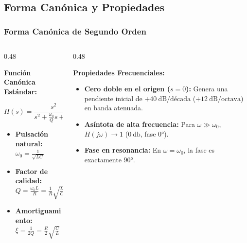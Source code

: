 \subsection{Forma Canónica y Propiedades}
\begin{frame}
  \frametitle{Forma Canónica de Segundo Orden}

  \begin{columns}[t, onlytextwidth]
    \begin{column}{0.48\textwidth}
      \begin{tarjeta}
        {\fontsize{9pt}{11pt}\selectfont \textbf{\color{NavyDark} Función Canónica Estándar:}}\\[2pt]
        {\fontsize{8pt}{10pt}\selectfont
        \[ H(s) = \frac{s^2}{s^2 + \frac{\omega_0}{Q} s + \omega_0^2} = \frac{s^2}{s^2 + 2\xi\omega_0 s + \omega_0^2} \]
        \begin{itemize}\setlength{\itemsep}{2pt}
          \item \textbf{Pulsación natural:} $\omega_0 = \frac{1}{\sqrt{LC}}$
          \item \textbf{Factor de calidad:} $Q = \frac{\omega_0 L}{R} = \frac{1}{R} \sqrt{\frac{L}{C}}$
          \item \textbf{Amortiguamiento:} $\xi = \frac{1}{2Q} = \frac{R}{2} \sqrt{\frac{C}{L}}$
        \end{itemize}
        }
      \end{tarjeta}
    \end{column}

    \begin{column}{0.48\textwidth}
      \begin{tarjeta}
        {\fontsize{9pt}{11pt}\selectfont \textbf{\color{NavyDark} Propiedades Frecuenciales:}}\\[2pt]
        {\fontsize{8pt}{10pt}\selectfont
        \begin{itemize}\setlength{\itemsep}{2.5pt}
          \item \textbf{Cero doble en el origen ($s=0$):}
          Genera una pendiente inicial de $+40\ \text{dB/década}$ ($+12\ \text{dB/octava}$) en banda atenuada.
          \item \textbf{Asíntota de alta frecuencia:}
          Para $\omega \gg \omega_0$, $H(j\omega) \to 1$ ($\qty{0}{\decibel}$, fase $\ang{0}$).
          \item \textbf{Fase en resonancia:}
          En $\omega = \omega_0$, la fase es exactamente $\ang{+90}$.
        \end{itemize}
        }
      \end{tarjeta}
    \end{column}
  \end{columns}
\end{frame}
